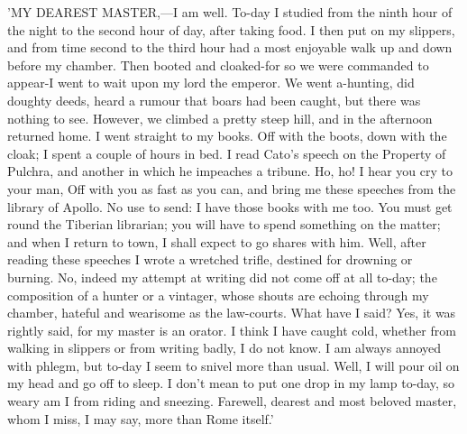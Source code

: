 'MY DEAREST MASTER,—I am well. To-day I studied from the ninth hour
of the night to the second hour of day, after taking food. I then put on
my slippers, and from time second to the third hour had a most enjoyable
walk up and down before my chamber. Then booted and cloaked-for so we
were commanded to appear-I went to wait upon my lord the emperor. We went
a-hunting, did doughty deeds, heard a rumour that boars had been caught,
but there was nothing to see. However, we climbed a pretty steep hill,
and in the afternoon returned home. I went straight to my books. Off with
the boots, down with the cloak; I spent a couple of hours in bed. I read
Cato's speech on the Property of Pulchra, and another in which he
impeaches a tribune. Ho, ho! I hear you cry to your man, Off with you as
fast as you can, and bring me these speeches from the library of Apollo.
No use to send: I have those books with me too. You must get round the
Tiberian librarian; you will have to spend something on the matter; and
when I return to town, I shall expect to go shares with him. Well, after
reading these speeches I wrote a wretched trifle, destined for drowning
or burning. No, indeed my attempt at writing did not come off at all
to-day; the composition of a hunter or a vintager, whose shouts are
echoing through my chamber, hateful and wearisome as the law-courts. What
have I said? Yes, it was rightly said, for my master is an orator. I
think I have caught cold, whether from walking in slippers or from
writing badly, I do not know. I am always annoyed with phlegm, but to-day
I seem to snivel more than usual. Well, I will pour oil on my head and go
off to sleep. I don't mean to put one drop in my lamp to-day, so weary am
I from riding and sneezing. Farewell, dearest and most beloved master,
whom I miss, I may say, more than Rome itself.'


